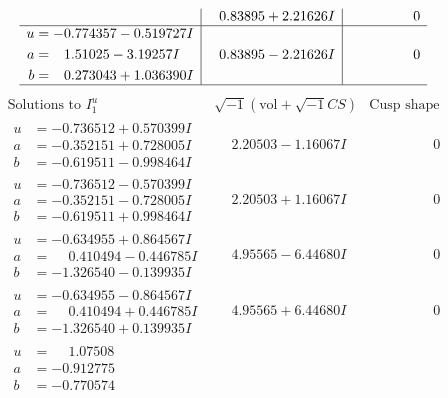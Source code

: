 \documentclass[1p]{elsarticle_modified}
\theoremstyle{definition}
\newcommand{\I}{\sqrt{-1}}
\begin{document}
$$\begin{array}{c|c|c}
 & \phantom{-}0.83895 + 2.21626 I & \phantom{-0.000000 } 0 \\ \hline\begin{aligned}
u &= -0.774357 - 0.519727 I \\
a &= \phantom{-}1.51025 - 3.19257 I \\
b &= \phantom{-}0.273043 + 1.036390 I\end{aligned}
 & \phantom{-}0.83895 - 2.21626 I & \phantom{-0.000000 } 0\\
 \hline 
 \end{array}$$\newpage$$\begin{array}{c|c|c}  
\text{Solutions to }I^u_{1}& \I (\text{vol} + \sqrt{-1}CS) & \text{Cusp shape}\\
 \hline 
\begin{aligned}
u &= -0.736512 + 0.570399 I \\
a &= -0.352151 + 0.728005 I \\
b &= -0.619511 - 0.998464 I\end{aligned}
 & \phantom{-}2.20503 - 1.16067 I & \phantom{-0.000000 } 0 \\ \hline\begin{aligned}
u &= -0.736512 - 0.570399 I \\
a &= -0.352151 - 0.728005 I \\
b &= -0.619511 + 0.998464 I\end{aligned}
 & \phantom{-}2.20503 + 1.16067 I & \phantom{-0.000000 } 0 \\ \hline\begin{aligned}
u &= -0.634955 + 0.864567 I \\
a &= \phantom{-}0.410494 - 0.446785 I \\
b &= -1.326540 - 0.139935 I\end{aligned}
 & \phantom{-}4.95565 - 6.44680 I & \phantom{-0.000000 } 0 \\ \hline\begin{aligned}
u &= -0.634955 - 0.864567 I \\
a &= \phantom{-}0.410494 + 0.446785 I \\
b &= -1.326540 + 0.139935 I\end{aligned}
 & \phantom{-}4.95565 + 6.44680 I & \phantom{-0.000000 } 0 \\ \hline\begin{aligned}
u &= \phantom{-}1.07508\phantom{ +0.000000I} \\
a &= -0.912775\phantom{ +0.000000I} \\
b &= -0.770574\phantom{ +0.000000I}\end{aligned}

\end{array}$$
\end{document}
